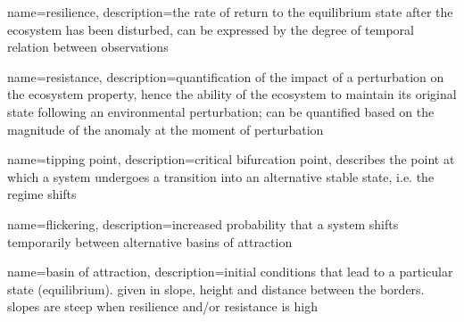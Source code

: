 {
    name=resilience,
    description={the rate of return to the equilibrium state after the ecosystem has been disturbed, can be expressed by the degree of temporal relation between observations \citep{telesca2006, telesca2008, zaccarelli2013, dakos2012}}
}

{
    name=resistance,
    description={quantification of the impact of a perturbation on the ecosystem property, hence the ability of the ecosystem to maintain its original state following an environmental perturbation; can be quantified based on the magnitude of the anomaly at the moment of perturbation \citep{lloret2007, vanruijven2010, vogel2012}}
}


{
    name=tipping point,
    description={critical bifurcation point, describes the point at which a system undergoes a transition into an alternative stable state, i.e. the regime shifts \citep{scheffer2001}}
}

{
    name=flickering,
    description={increased probability that a system shifts temporarily between alternative basins of attraction \citep{dakos2012}}
}


{
    name=basin of attraction,
    description={initial conditions that lead to a particular state (equilibrium). given in slope, height and distance between the borders. slopes are steep when resilience and/or resistance is high \citep{scheffer2001}}
}